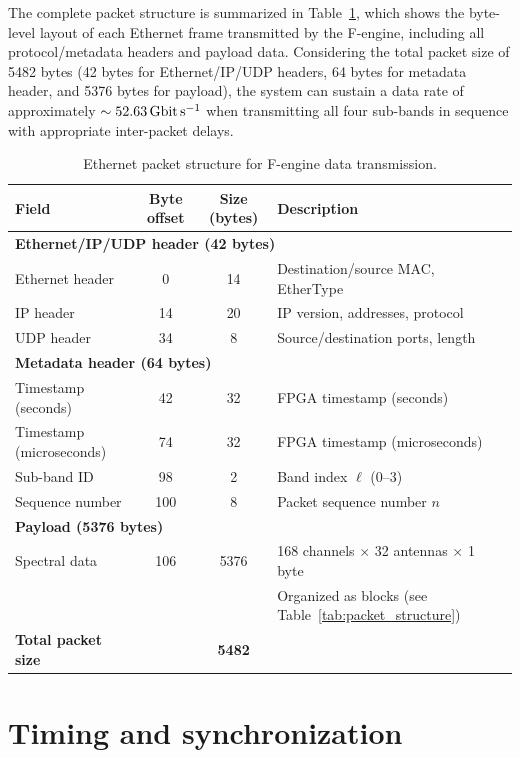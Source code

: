 The complete packet structure is summarized in Table~\ref{tab:ethernet_packet_structure}, which shows the byte-level layout of each Ethernet frame transmitted by the F-engine, including all protocol/metadata headers and payload data. Considering the total packet size of 5482 bytes (42 bytes for Ethernet/IP/UDP headers, 64 bytes for metadata header, and 5376 bytes for payload), the system can sustain a data rate of approximately $\sim\SI{52.63}{\giga\bit\per\second}$ when transmitting all four sub-bands in sequence with appropriate inter-packet delays.

\begin{table}[t]
\centering
\caption{Ethernet packet structure for F-engine data transmission.}
\label{tab:ethernet_packet_structure}
\begin{tabular}{lccl}
\toprule
Field & Byte offset & Size (bytes) & Description \\
\midrule
\multicolumn{4}{l}{\textbf{Ethernet/IP/UDP header (42 bytes)}} \\
\quad Ethernet header & 0 & 14 & Destination/source MAC, EtherType \\
\quad IP header & 14 & 20 & IP version, addresses, protocol \\
\quad UDP header & 34 & 8 & Source/destination ports, length \\
\midrule
\multicolumn{4}{l}{\textbf{Metadata header (64 bytes)}} \\
\quad Timestamp (seconds) & 42 & 32 & FPGA timestamp (seconds) \\
\quad Timestamp (microseconds) & 74 & 32 & FPGA timestamp (microseconds) \\
\quad Sub-band ID & 98 & 2 & Band index $\ell$ (0--3) \\
\quad Sequence number & 100 & 8 & Packet sequence number $n$ \\
\midrule
\multicolumn{4}{l}{\textbf{Payload (5376 bytes)}} \\
\quad Spectral data & 106 & 5376 & 168 channels $\times$ 32 antennas $\times$ 1 byte \\
& & & Organized as blocks (see Table~\ref{tab:packet_structure}) \\
\midrule
\textbf{Total packet size} & & \textbf{5482} & \\
\bottomrule
\end{tabular}
\end{table}


\section{Timing and synchronization}
\label{sec:timing_sync}

